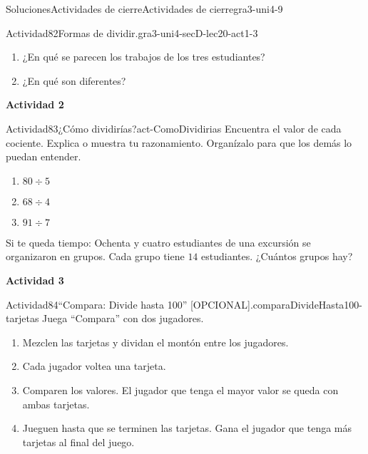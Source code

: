 \documentclass[twoside,10pt,]{article}
\begin{document}
\begin{solutions-section}{Soluciones}{Actividades de cierre}{}{Actividades de cierre}{}{}{gra3-uni4-9}
\begin{activitysolution}{Actividad}{82}{Formas de dividir.}{gra3-uni4-secD-lec20-act1-3}
\begin{enumerate}
\begin{sidebyside}{2}{0}{0}{0}
\begin{sbspanel}{0.5}
\end{sbspanel}%
\begin{sbspanel}{0.5}%
Tyler%
\par
\(3\times 20 = 60\)\\
 \(3\times \phantom{0}6 = 18\)\\
 \\
 \(20 + 6 = 26\)%
\end{sbspanel}%
\end{sidebyside}%
\item{}¿En qué se parecen los trabajos de los tres estudiantes?%
\item{}¿En qué son diferentes?%
\end{enumerate}
\end{activitysolution}%
\par\medskip
\noindent\textbf{\large{}\space\textperiodcentered\space{}Actividad 2}
\begin{activitysolution}{Actividad}{83}{¿Cómo dividirías?}{act-ComoDividirias}%
Encuentra el valor de cada cociente. Explica o muestra tu razonamiento. Organízalo para que los demás lo puedan entender.%
%
\begin{enumerate}
\item{}\(\displaystyle 80\div 5\)%
\item{}\(\displaystyle 68\div 4\)%
\item{}\(\displaystyle 91\div 7\)%
\end{enumerate}
Si te queda tiempo: Ochenta y cuatro estudiantes de una excursión se organizaron en grupos. Cada grupo tiene \(14\) estudiantes. ¿Cuántos grupos hay?%
\end{activitysolution}%
\par\medskip
\noindent\textbf{\large{}\space\textperiodcentered\space{}Actividad 3}
\begin{activitysolution}{Actividad}{84}{“Compara: Divide hasta 100” [OPCIONAL].}{comparaDivideHasta100-tarjetas}%
Juega ``Compara'' con dos jugadores.%
%
\begin{enumerate}
\item{}Mezclen las tarjetas y dividan el montón entre los jugadores.%
\item{}Cada jugador voltea una tarjeta.%
\item{}Comparen los valores. El jugador que tenga el mayor valor se queda con ambas tarjetas.%
\item{}Jueguen hasta que se terminen las tarjetas. Gana el jugador que tenga más tarjetas al final del juego.%
\end{enumerate}

\end{activitysolution}
\end{solutions-section}
\end{document}
